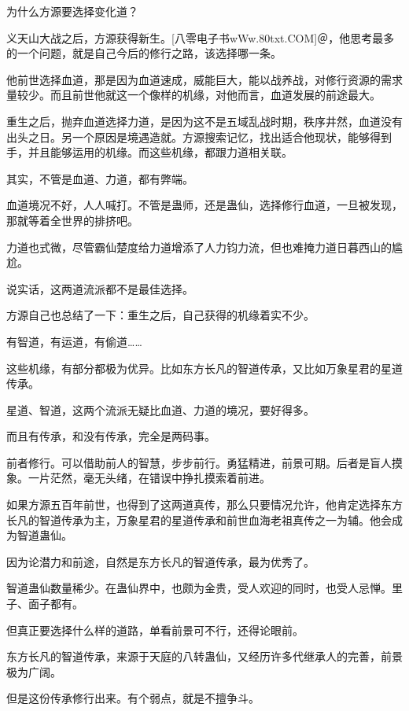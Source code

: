 
\begin{this_body}

为什么方源要选择变化道？

义天山大战之后，方源获得新生。[八零电子书wWw.80txt.COM]＠，他思考最多的一个问题，就是自己今后的修行之路，该选择哪一条。

他前世选择血道，那是因为血道速成，威能巨大，能以战养战，对修行资源的需求量较少。而且前世他就这一个像样的机缘，对他而言，血道发展的前途最大。

重生之后，抛弃血道选择力道，是因为这不是五域乱战时期，秩序井然，血道没有出头之日。另一个原因是境遇造就。方源搜索记忆，找出适合他现状，能够得到手，并且能够运用的机缘。而这些机缘，都跟力道相关联。

其实，不管是血道、力道，都有弊端。

血道境况不好，人人喊打。不管是蛊师，还是蛊仙，选择修行血道，一旦被发现，那就等着全世界的排挤吧。

力道也式微，尽管霸仙楚度给力道增添了人力钧力流，但也难掩力道日暮西山的尴尬。

说实话，这两道流派都不是最佳选择。

方源自己也总结了一下：重生之后，自己获得的机缘着实不少。

有智道，有运道，有偷道……

这些机缘，有部分都极为优异。比如东方长凡的智道传承，又比如万象星君的星道传承。

星道、智道，这两个流派无疑比血道、力道的境况，要好得多。

而且有传承，和没有传承，完全是两码事。

前者修行。可以借助前人的智慧，步步前行。勇猛精进，前景可期。后者是盲人摸象。一片茫然，毫无头绪，在错误中挣扎摸索着前进。

如果方源五百年前世，也得到了这两道真传，那么只要情况允许，他肯定选择东方长凡的智道传承为主，万象星君的星道传承和前世血海老祖真传之一为辅。他会成为智道蛊仙。

因为论潜力和前途，自然是东方长凡的智道传承，最为优秀了。

智道蛊仙数量稀少。在蛊仙界中，也颇为金贵，受人欢迎的同时，也受人忌惮。里子、面子都有。

但真正要选择什么样的道路，单看前景可不行，还得论眼前。

东方长凡的智道传承，来源于天庭的八转蛊仙，又经历许多代继承人的完善，前景极为广阔。

但是这份传承修行出来。有个弱点，就是不擅争斗。


\end{this_body}
